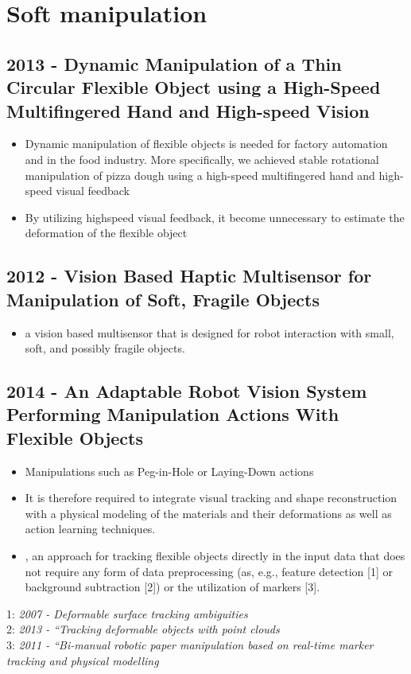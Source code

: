 \section{Soft manipulation}
\subsection{2013 - Dynamic Manipulation of a Thin Circular Flexible Object using a High-Speed Multifingered Hand and High-speed Vision}
\begin{itemize}
\item Dynamic manipulation of flexible objects is needed
for factory automation and in the food industry. More specifically, we achieved stable rotational manipulation of pizza dough using a high-speed multifingered hand and high-speed visual feedback
\item  By utilizing highspeed visual feedback, it become unnecessary to estimate the deformation of the flexible object
\end{itemize}

\subsection{2012 - Vision Based Haptic Multisensor for Manipulation of Soft, Fragile Objects}
\begin{itemize}
\item a vision based multisensor that is designed for robot interaction with small, soft, and possibly fragile objects. 
\end{itemize}


\subsection{2014 - An Adaptable Robot Vision System Performing Manipulation Actions With Flexible Objects}
\begin{itemize}
\item Manipulations such as Peg-in-Hole or
Laying-Down actions
\item It is therefore required to integrate visual tracking and shape reconstruction with a physical modeling of the materials and their deformations as well as action learning techniques.
\item , an approach for tracking flexible objects directly
in the input data that does not require any form of data preprocessing (as, e.g., feature detection [1] or background subtraction [2]) or the utilization of markers [3].
\end{itemize}
1: \textit{2007 - Deformable surface tracking
ambiguities} \\
2: \textit{2013 - “Tracking deformable objects with point clouds} \\
3: \textit{2011 - “Bi-manual robotic paper manipulation
based on real-time marker tracking and physical modelling}


